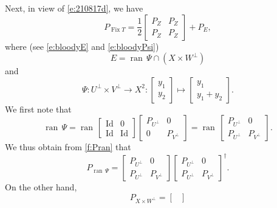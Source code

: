 \documentclass[11pt]{article}
\newcommand{\ran}{\ensuremath{{\operatorname{ran}}\,}}
\newcommand{\Fix}{\ensuremath{\operatorname{Fix}}}
\newcommand{\Id}{\ensuremath{\operatorname{Id}}}
\theoremstyle{definition}
\providecommand{\ran}{\operatorname{ran}}
\providecommand{\Id}{\operatorname{{ Id}}}
\providecommand{\ran}{\operatorname{ran}}
\providecommand{\Id}{\operatorname{Id}}
\begin{document}
{\begin{subequations}
\end{subequations}
Next, in view of \cref{e:210817d}, 
we have 
\begin{equation}
\label{e:zahn4}
P_{\Fix T}
= \frac{1}{2}
\begin{bmatrix}
P_Z & P_Z \\
P_Z & P_Z
\end{bmatrix}
+ P_E,
\end{equation}
where (see \cref{e:bloodyE} and \cref{e:bloodyPsi})
\begin{equation}
\label{e:zahn0}
E = \ran\Psi \cap (X\times W^\perp)
\end{equation}
and 
\begin{equation*}
\Psi \colon U^\perp \times V^\perp \to X^2
\colon \begin{bmatrix} y_1\\y_2\end{bmatrix}
\mapsto \begin{bmatrix} y_1\\y_1+y_2\end{bmatrix}. 
\end{equation*}
We first note that 
\begin{equation*}
\ran \Psi = \ran 
\begin{bmatrix}
\Id & 0 \\
\Id & \Id
\end{bmatrix}
\begin{bmatrix}
P_{U^\perp} & 0 \\
0 & P_{V^\perp}
\end{bmatrix}
=\ran
\begin{bmatrix}
P_{U^\perp} & 0 \\
P_{U^\perp} & P_{V^\perp}
\end{bmatrix}. 
\end{equation*}
We thus obtain from \cref{f:Pran} that 
\begin{equation}
\label{e:zahn1}
P_{\ran\Psi} = \begin{bmatrix}
P_{U^\perp} & 0 \\
P_{U^\perp} & P_{V^\perp}
\end{bmatrix}
\begin{bmatrix}
P_{U^\perp} & 0 \\
P_{U^\perp} & P_{V^\perp}
\end{bmatrix}^\dagger.
\end{equation}
On the other hand,
\begin{equation}
\label{e:zahn2}
P_{X\times W^\perp}
= \begin{bmatrix}

\end{bmatrix}
\end{equation}}
\end{document}
